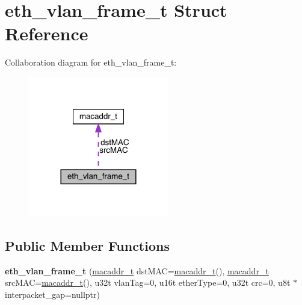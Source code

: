 \hypertarget{structeth__vlan__frame__t}{}\section{eth\+\_\+vlan\+\_\+frame\+\_\+t Struct Reference}
\label{structeth__vlan__frame__t}


Collaboration diagram for eth\+\_\+vlan\+\_\+frame\+\_\+t\+:\nopagebreak
\begin{figure}[H]
\begin{center}
\leavevmode
\includegraphics[width=173pt]{structeth__vlan__frame__t__coll__graph}
\end{center}
\end{figure}
\subsection*{Public Member Functions}
\begin{DoxyCompactItemize}
\item 
\mbox{\label{structeth__vlan__frame__t_afd8ff79bdc0fd97dd158d1b0e6842363}} 
{\bfseries eth\+\_\+vlan\+\_\+frame\+\_\+t} (\mbox{\hyperlink{structmacaddr__t}{macaddr\+\_\+t}} dst\+M\+AC=\mbox{\hyperlink{structmacaddr__t}{macaddr\+\_\+t}}(), \mbox{\hyperlink{structmacaddr__t}{macaddr\+\_\+t}} src\+M\+AC=\mbox{\hyperlink{structmacaddr__t}{macaddr\+\_\+t}}(), u32t vlan\+Tag=0, u16t ether\+Type=0, u32t crc=0, u8t $\ast$interpacket\+\_\+gap=nullptr)
\end{DoxyCompactItemize}
